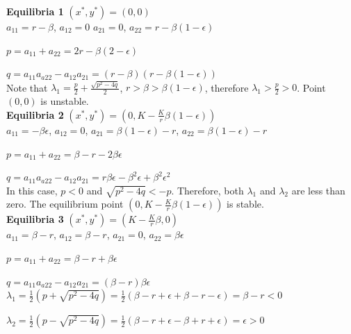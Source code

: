 \documentclass[11pt,letterpaper]{article}
\begin{document}
\noindent \textbf{Equilibria 1} $(x^*, y^*) = (0, 0)$ \\

\noindent $a_{11} = r - \beta$, $a_{12} = 0$ $a_{21} = 0$, $a_{22} = r - \beta (1 - \epsilon)$ 

\noindent $p = a_{11} + a_{22} = 2 r - \beta (2 - \epsilon)$

\noindent $q = a_{11}a_{a22} - a_{12} a_{21} = (r - \beta)(r - \beta(1 - \epsilon))$\\

\noindent Note that $\lambda_1 = \frac{p}{2} + \frac{\sqrt{p^2 - 4q}}{2}$, $r > \beta > \beta (1 - \epsilon)$, therefore $\lambda_1 > \frac{p}{2} > 0 $. Point $(0, 0)$ is unstable. \\

\noindent \textbf{Equilibria 2}  $(x^*, y^*) = (0, K - \frac{K}{r} \beta (1 - \epsilon))$ \\

\noindent $a_{11} = - \beta \epsilon$, $a_{12} = 0$, $a_{21} = \beta (1 - \epsilon) - r$, $a_{22} = \beta (1 - \epsilon) - r$

\noindent $p = a_{11} + a_{22} = \beta - r - 2 \beta \epsilon $

\noindent $q =  a_{11}a_{a22} - a_{12} a_{21} = r \beta \epsilon - \beta^2 \epsilon + \beta^2 \epsilon^2 $ \\


\noindent In this case, $p < 0$ and $\sqrt{p^2 - 4q} < - p $. Therefore, both $\lambda_1$ and $\lambda_2$ are less than zero. The equilibrium point $(0, K - \frac{K}{r} \beta (1 - \epsilon))$ is stable. \\

\noindent \textbf{Equilibria 3}  $(x^*, y^*) = (K - \frac{K}{r} \beta, 0)$ \\

\noindent $a_{11} = \beta - r$, $a_{12} = \beta - r$, $a_{21} = 0$, $a_{22} = \beta \epsilon$ 

\noindent $p = a_{11} + a_{22} = \beta -r + \beta \epsilon$

\noindent $q =  a_{11}a_{a22} - a_{12} a_{21} = (\beta - r) \beta \epsilon$ \\

\noindent $\lambda_1 = \frac{1}{2}(p + \sqrt{p^2 - 4q}) = \frac{1}{2} (\beta - r + \epsilon + \beta - r - \epsilon) = \beta - r < 0$

\noindent $\lambda_2 = \frac{1}{2}(p - \sqrt{p^2 - 4q}) = \frac{1}{2} (\beta - r + \epsilon - \beta + r + \epsilon) = \epsilon > 0$ \\
\end{document}
